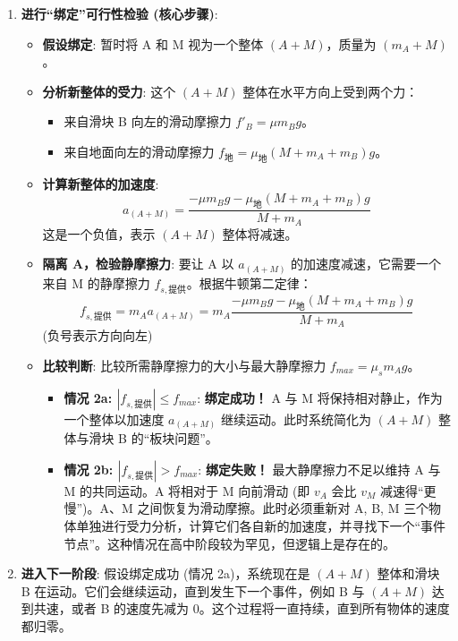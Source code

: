 \documentclass[a4paper,11pt]{ctexart}
\begin{document}
\begin{enumerate}
    \item \textbf{进行“绑定”可行性检验 (核心步骤)}:
        \begin{itemize}
            \item \textbf{假设绑定}: 暂时将 A 和 M 视为一个整体 $(A+M)$，质量为 $(m_A+M)$。
            \item \textbf{分析新整体的受力}: 这个 $(A+M)$ 整体在水平方向上受到两个力：
                \begin{itemize}
                    \item 来自滑块 B 向左的滑动摩擦力 $f'_{B} = \mu m_B g$。
                    \item 来自地面向左的滑动摩擦力 $f_{地} = \mu_{地}(M+m_A+m_B)g$。
                \end{itemize}
            \item \textbf{计算新整体的加速度}:
            \[ a_{(A+M)} = \frac{-\mu m_B g - \mu_{地}(M+m_A+m_B)g}{M+m_A} \]
            这是一个负值，表示 $(A+M)$ 整体将减速。
            \item \textbf{隔离 A，检验静摩擦力}: 要让 A 以 $a_{(A+M)}$ 的加速度减速，它需要一个来自 M 的静摩擦力 $f_{s, 提供}$。根据牛顿第二定律：
            \[ f_{s, 提供} = m_A a_{(A+M)} = m_A \frac{-\mu m_B g - \mu_{地}(M+m_A+m_B)g}{M+m_A} \]
            (负号表示方向向左)
            \item \textbf{比较判断}: 比较所需静摩擦力的大小与最大静摩擦力 $f_{max} = \mu_s m_A g$。
                \begin{itemize}
                    \item \textcolor{FormulaColor}{\textbf{情况 2a: $|f_{s, 提供}| \le f_{max}$}}: \textbf{绑定成功！} A 与 M 将保持相对静止，作为一个整体以加速度 $a_{(A+M)}$ 继续运动。此时系统简化为 $(A+M)$ 整体与滑块 B 的“板块问题”。
                    \item \textcolor{HighlightColor}{\textbf{情况 2b: $|f_{s, 提供}| > f_{max}$}}: \textbf{绑定失败！} 最大静摩擦力不足以维持 A 与 M 的共同运动。A 将相对于 M 向前滑动 (即 $v_A$ 会比 $v_M$ 减速得“更慢”)。A、M 之间恢复为滑动摩擦。此时必须重新对 A, B, M 三个物体单独进行受力分析，计算它们各自新的加速度，并寻找下一个“事件节点”。这种情况在高中阶段较为罕见，但逻辑上是存在的。
                \end{itemize}
        \end{itemize}
    \item \textbf{进入下一阶段}: 假设绑定成功 (情况 2a)，系统现在是 $(A+M)$ 整体和滑块 B 在运动。它们会继续运动，直到发生下一个事件，例如 B 与 $(A+M)$ 达到共速，或者 B 的速度先减为 0。这个过程将一直持续，直到所有物体的速度都归零。
\end{enumerate}
\end{document}
